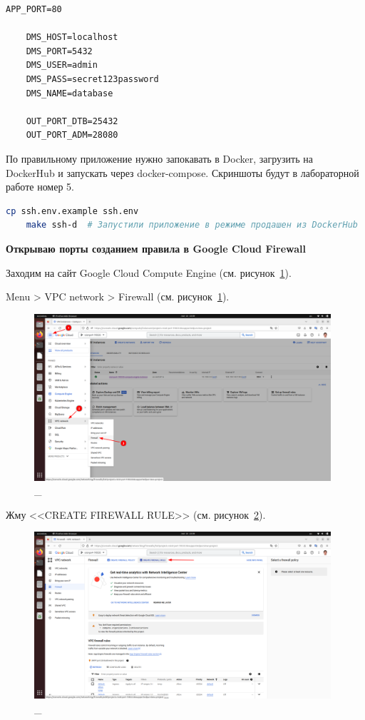 \documentclass[12pt, a4paper, simple]{eskdtext}
\begin{document}
  \begin{lstlisting}[name=dev.env для c БД Postgres установленной на Linux]
    APP_PORT=80

    DMS_HOST=localhost
    DMS_PORT=5432
    DMS_USER=admin
    DMS_PASS=secret123password
    DMS_NAME=database

    OUT_PORT_DTB=25432
    OUT_PORT_ADM=28080
  \end{lstlisting}

  По правильному приложение нужно запокавать в Docker, загрузить на DockerHub и запускать через docker-compose.
  Скриншоты будут в лабораторной работе номер 5.

  \begin{lstlisting}[language=bash,name=Запуск режима prod]
    cp ssh.env.example ssh.env
    make ssh-d  # Запустили приложение в режиме продашен из DockerHub
  \end{lstlisting}

  \newpage

  \newpage

  \textbf{Открываю порты созданием правила в Google Cloud Firewall}

  Заходим на сайт Google Cloud Compute Engine \cite{GoogleCloudComputeEngine} (см. рисунок~\ref{fig:15}).

  Menu > VPC network > Firewall \cite{GoogleCloudFirewall} (см. рисунок~\ref{fig:15}).
  
  \begin{figure}[!h]
    \centering
    \includegraphics[width=11cm]
    {images/2023-02-25_23-09-26.png}
    \caption{\_}
    \label{fig:15}
  \end{figure}

  Жму <<CREATE FIREWALL RULE>> (см. рисунок~\ref{fig:16}).

  \begin{figure}[!h]
    \centering
    \includegraphics[width=11cm]
    {images/2023-02-25_23-09-57.png}
    \caption{\_}
    \label{fig:16}
  \end{figure}
\end{document}
